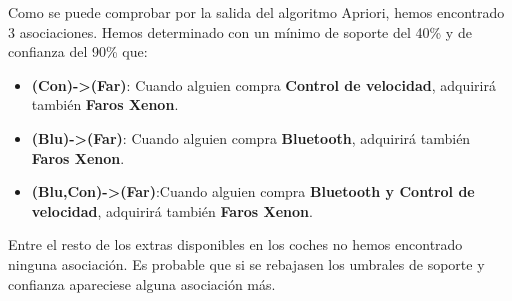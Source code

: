 \documentclass [a4paper] {article}
\begin{document}
Como se puede comprobar por la salida del algoritmo Apriori, hemos
encontrado 3 asociaciones. Hemos determinado con un mínimo de soporte
del 40\% y de confianza del 90\% que:

\begin{itemize}
\item \textbf{(Con)->(Far)}: Cuando alguien compra \textbf{Control de velocidad}, 
                             adquirirá también \textbf{Faros Xenon}.
\item \textbf{(Blu)->(Far)}: Cuando alguien compra \textbf{Bluetooth}, adquirirá
                             también \textbf{Faros Xenon}.
\item \textbf{(Blu,Con)->(Far)}:Cuando alguien compra \textbf{Bluetooth y Control de velocidad},
                                adquirirá también \textbf{Faros Xenon}.
\end{itemize}

Entre el resto de los extras disponibles en los coches no hemos encontrado
ninguna asociación. Es probable que si se rebajasen los umbrales de
soporte y confianza apareciese alguna asociación más.
\end{document}
